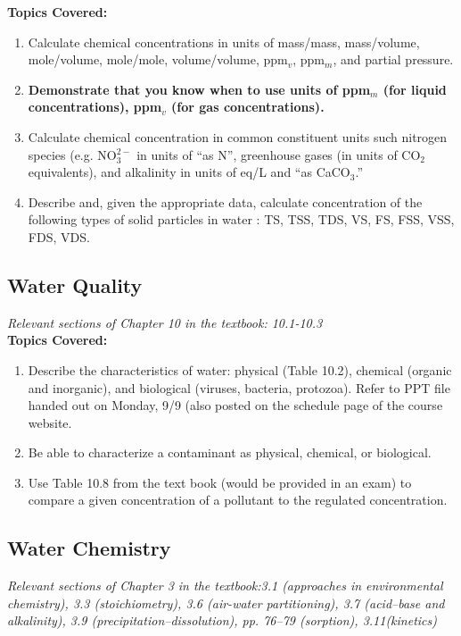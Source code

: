 \documentclass[12pt,letterpaper]{article}
\begin{document}
\textbf{Topics Covered:}\\
\begin{enumerate}
\item Calculate chemical concentrations in units of mass/mass, mass/volume, mole/volume, mole/mole, volume/volume, ppm$_v$, ppm$_m$, and partial pressure.
\item \textbf{Demonstrate that you know when to use units of ppm$_m$ (for liquid concentrations), ppm$_v$ (for gas concentrations).}
\item Calculate chemical concentration in common constituent units such nitrogen species (e.g. NO$_3^{2-}$ in units of ``as N'', greenhouse gases (in units of CO$_2$ equivalents), and alkalinity in units of eq/L and ``as CaCO$_3$.'' 
\item Describe and, given the appropriate data, calculate concentration of the following types of solid particles in water : TS, TSS, TDS, VS, FS, FSS, VSS, FDS, VDS.
\end{enumerate}

\subsection *{Water Quality}
\emph{Relevant sections of Chapter 10 in the textbook: 10.1-10.3}\\

\textbf{Topics Covered:}\\

\begin{enumerate}
\item Describe the characteristics of water: physical (Table 10.2), chemical (organic and inorganic), and biological (viruses, bacteria, protozoa). Refer to PPT file handed out on Monday, 9/9 (also posted on the schedule page of the course website.
\item Be able to characterize a contaminant as physical, chemical, or biological.
\item Use Table 10.8 from the text book (would be provided in an exam) to compare a given concentration of a pollutant to the regulated concentration.
\end{enumerate}

\subsection *{Water Chemistry}

\emph{Relevant sections of Chapter 3 in the textbook:3.1 (approaches in environmental chemistry), 3.3 (stoichiometry), 3.6 (air-water partitioning), 3.7 (acid--base and alkalinity), 3.9 (precipitation--dissolution), pp. 76--79 (sorption), 3.11(kinetics)}\\
\end{document}
